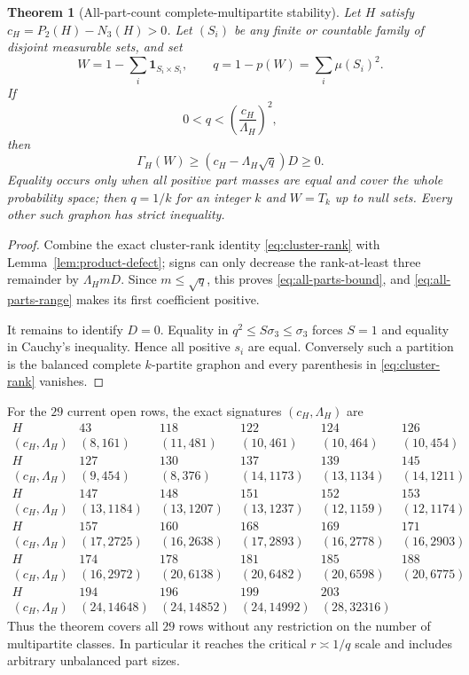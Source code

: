 \documentclass[11pt]{article}
\newtheorem{theorem}{Theorem}[section]
\newcommand{\Gap}{\Gamma_H}
\begin{document}
\begin{theorem}[All-part-count complete-multipartite stability]
Let $H$ satisfy $c_H=P_2(H)-N_3(H)>0$.  Let $(S_i)$ be any finite or
countable family of disjoint measurable sets, and set
\[
 W=1-\sum_i\mathbf1_{S_i\times S_i},
 \qquad q=1-p(W)=\sum_i\mu(S_i)^2.
\]
If
\begin{equation}
 0<q<\left(\frac{c_H}{\Lambda_H}\right)^2,
 \label{eq:all-parts-range}
\end{equation}
then
\begin{equation}
 \Gap(W)\geq(c_H-\Lambda_H\sqrt q)D\geq0.
 \label{eq:all-parts-bound}
\end{equation}
Equality occurs only when all positive part masses are equal and cover the
whole probability space; then $q=1/k$ for an integer $k$ and $W=T_k$ up to
null sets.  Every other such graphon has strict inequality.
\end{theorem}

\begin{proof}
Combine the exact cluster-rank identity \eqref{eq:cluster-rank} with
Lemma~\ref{lem:product-defect}; signs can only decrease the rank-at-least
three remainder by $\Lambda_HmD$.  Since $m\leq\sqrt q$, this proves
\eqref{eq:all-parts-bound}, and \eqref{eq:all-parts-range} makes its first
coefficient positive.

It remains to identify $D=0$.  Equality in
$q^2\leq S\sigma_3\leq\sigma_3$ forces $S=1$ and equality in Cauchy's
inequality.  Hence all positive $s_i$ are equal.  Conversely such a
partition is the balanced complete $k$-partite graphon and every parenthesis
in \eqref{eq:cluster-rank} vanishes.
\end{proof}

For the $29$ current open rows, the exact signatures $(c_H,\Lambda_H)$ are
\[
\begin{array}{c|rrrrr}
H&43&118&122&124&126\\
(c_H,\Lambda_H)&(8,161)&(11,481)&(10,461)&(10,464)&(10,454)\\ \hline
H&127&130&137&139&145\\
(c_H,\Lambda_H)&(9,454)&(8,376)&(14,1173)&(13,1134)&(14,1211)\\ \hline
H&147&148&151&152&153\\
(c_H,\Lambda_H)&(13,1184)&(13,1207)&(13,1237)&(12,1159)&(12,1174)\\ \hline
H&157&160&168&169&171\\
(c_H,\Lambda_H)&(17,2725)&(16,2638)&(17,2893)&(16,2778)&(16,2903)\\ \hline
H&174&178&181&185&188\\
(c_H,\Lambda_H)&(16,2972)&(20,6138)&(20,6482)&(20,6598)&(20,6775)\\ \hline
H&194&196&199&203&\\
(c_H,\Lambda_H)&(24,14648)&(24,14852)&(24,14992)&(28,32316)&
\end{array}
\]
Thus the theorem covers all $29$ rows without any restriction on the number
of multipartite classes.  In particular it reaches the critical
$r\asymp1/q$ scale and includes arbitrary unbalanced part sizes.
\end{document}

